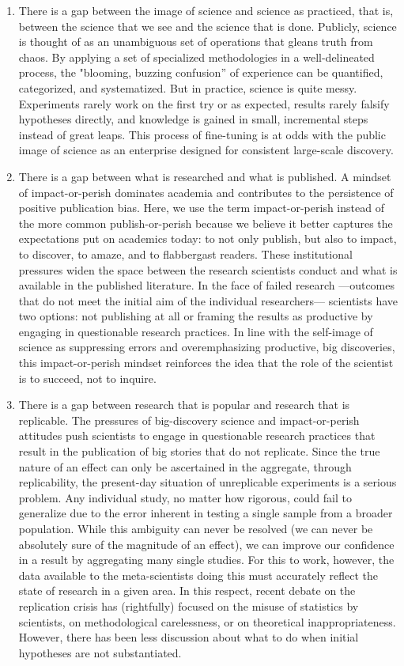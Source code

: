 \documentclass[twocolumn, serif, editorial, authordate]{jote-article}
\begin{document}
\begin{enumerate}
\item There is a gap between the image of science and science as practiced, that is, between the science that we see and the science that is done. Publicly, science is thought of as an unambiguous set of operations that gleans truth from chaos. By applying a set of specialized methodologies in a well-delineated process, the "blooming, buzzing confusion'' of experience can be quantified, categorized, and systematized. But in practice, science is quite messy. Experiments rarely work on the first try or as expected, results rarely falsify hypotheses directly, and knowledge is gained in small, incremental steps instead of great leaps. This process of fine-tuning is at odds with the public image of science as an enterprise designed for consistent large-scale discovery.
\item There is a gap between what is researched and what is published. A mindset of impact-or-perish dominates academia and contributes to the persistence of positive publication bias. Here, we use the term impact-or-perish instead of the more common publish-or-perish because we believe it better captures the expectations put on academics today: to not only publish, but also to impact, to discover, to amaze, and to flabbergast readers. These institutional pressures widen the space between the research scientists conduct and what is available in the published literature. In the face of failed research ---outcomes that do not meet the initial aim of the individual researchers--- scientists have two options: not publishing at all or framing the results as productive by engaging in questionable research practices. In line with the self-image of science as suppressing errors and overemphasizing productive, big discoveries, this impact-or-perish mindset reinforces the idea that the role of the scientist is to succeed, not to inquire.
\item There is a gap between research that is popular and research that is replicable. The pressures of big-discovery science and impact-or-perish attitudes push scientists to engage in questionable research practices that result in the publication of big stories that do not replicate. Since the true nature of an effect can only be ascertained in the aggregate, through replicability, the present-day situation of unreplicable experiments is a serious problem. Any individual study, no matter how rigorous, could fail to generalize due to the error inherent in testing a single sample from a broader population. While this ambiguity can never be resolved (we can never be absolutely sure of the magnitude of an effect), we can improve our confidence in a result by aggregating many single studies. For this to work, however, the data available to the meta-scientists doing this must accurately reflect the state of research in a given area. In this respect, recent debate on the replication crisis has (rightfully) focused on the misuse of statistics by scientists, on methodological carelessness, or on theoretical inappropriateness. However, there has been less discussion about what to do when initial hypotheses are not substantiated.
\end{enumerate}
\end{document}

